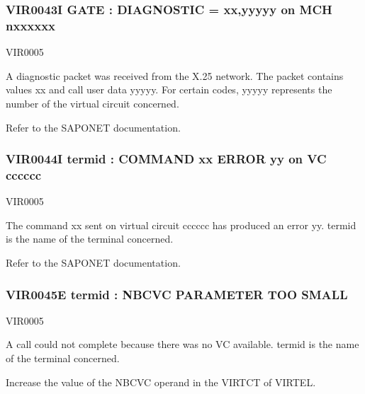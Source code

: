 \documentclass[letterpaper,10pt,english]{sphinxmanual}
\begin{document}
\subsubsection{VIR0043I GATE : DIAGNOSTIC = xx,yyyyy on MCH n\sphinxhyphen{}xxxxxx}
\label{\detokenize{messages:vir0043i-gate-diagnostic-xx-yyyyy-on-mch-n-xxxxxx}}\begin{description}
\sphinxAtStartPar
VIR0005

\sphinxAtStartPar
A diagnostic packet was received from the X.25 network. The packet contains values xx and call user data yyyyy. For certain codes, yyyyy represents the number of the virtual circuit concerned.

\sphinxAtStartPar
Refer to the SAPONET documentation.

\end{description}


\subsubsection{VIR0044I termid : COMMAND xx ERROR yy on VC cccccc}
\label{\detokenize{messages:vir0044i-termid-command-xx-error-yy-on-vc-cccccc}}\begin{description}
\sphinxAtStartPar
VIR0005

\sphinxAtStartPar
The command xx sent on virtual circuit cccccc has produced an error yy. termid is the name of the terminal concerned.

\sphinxAtStartPar
Refer to the SAPONET documentation.

\end{description}


\subsubsection{VIR0045E termid : NBCVC PARAMETER TOO SMALL}
\label{\detokenize{messages:vir0045e-termid-nbcvc-parameter-too-small}}\begin{description}
\sphinxAtStartPar
VIR0005

\sphinxAtStartPar
A call could not complete because there was no VC available. termid is the name of the terminal concerned.

\sphinxAtStartPar
Increase the value of the NBCVC operand in the VIRTCT of VIRTEL.

\end{description}
\end{document}
